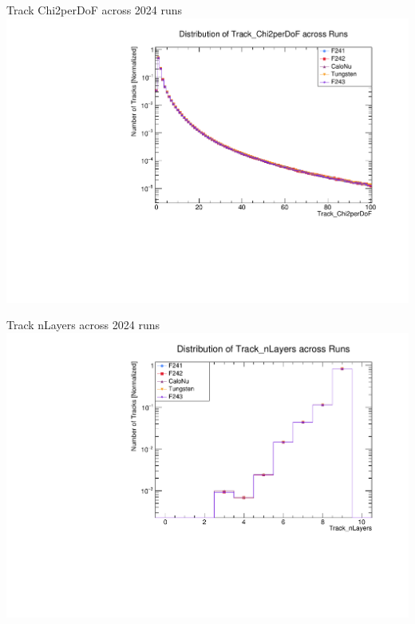 \begin{frame}{Track Chi2perDoF across 2024 runs}
	\includegraphics[width=\linewidth]{./RunwisePlots/Track_Chi2perDoF_runwise.pdf}
\end{frame}

\begin{frame}{Track nLayers across 2024 runs}
	\includegraphics[width=\linewidth]{./RunwisePlots/Track_nLayers_runwise.pdf}
\end{frame}

